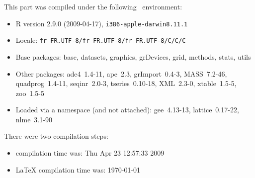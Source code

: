 \documentclass{article}
\begin{document}
\begin{scriptsize}

This part was compiled under the following \Rlogo{}~environment:

\begin{itemize}
  \item R version 2.9.0 (2009-04-17), \verb|i386-apple-darwin8.11.1|
  \item Locale: \verb|fr_FR.UTF-8/fr_FR.UTF-8/fr_FR.UTF-8/C/C/C|
  \item Base packages: base, datasets, graphics, grDevices, grid,
    methods, stats, utils
  \item Other packages: ade4~1.4-11, ape~2.3, grImport~0.4-3,
    MASS~7.2-46, quadprog~1.4-11, seqinr~2.0-3, tseries~0.10-18,
    XML~2.3-0, xtable~1.5-5, zoo~1.5-5
  \item Loaded via a namespace (and not attached): gee~4.13-13,
    lattice~0.17-22, nlme~3.1-90
\end{itemize}
There were two compilation steps:

\begin{itemize}
  \item \Rlogo{} compilation time was: Thu Apr 23 12:57:33 2009
  \item \LaTeX{} compilation time was: \today
\end{itemize}

\end{scriptsize}


\clearpage
{}


\end{document}
